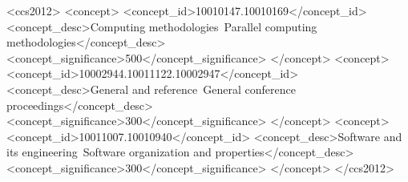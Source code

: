 \documentclass{sig-alternate-05-2015}
\begin{document}
%
\author{
%
}

\maketitle



%
%
\begin{CCSXML}
<ccs2012>
<concept>
<concept_id>10010147.10010169</concept_id>
<concept_desc>Computing methodologies~Parallel computing
methodologies</concept_desc>
<concept_significance>500</concept_significance>
</concept>
<concept>
<concept_id>10002944.10011122.10002947</concept_id>
<concept_desc>General and reference~General conference
proceedings</concept_desc>
<concept_significance>300</concept_significance>
</concept>
<concept>
<concept_id>10011007.10010940</concept_id>
<concept_desc>Software and its engineering~Software organization and properties</concept_desc>
<concept_significance>300</concept_significance>
</concept>
</ccs2012>
\end{CCSXML}



%
%
\end{document}
